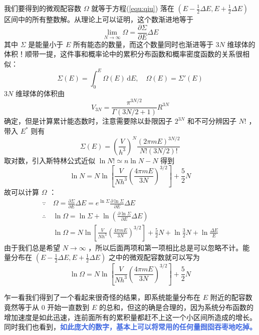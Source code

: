 我们要得到的微观配容数 $\Omega$ 就等于方程(\ref*{equ:qiu}) 落在 $(E-\frac{1}{2} \Delta E ,E+\frac{1}{2} \Delta E)$ 区间中的所有整数解。从理论上可以证明，这个数渐进地等于
\begin{equation}\label{equ:lim}
    \lim_{N\rightarrow \infty}\Omega = \frac{\partial \Sigma}{\partial E}\Delta E
\end{equation}
其中 $\Sigma$ 是能量小于 $E$ 所有能态的数量，而这个数量同时也渐进等于 $3N$ 维球体的体积！顺带一提，这件事和概率论中的累积分布函数和概率密度函数的关系很相似：
\[
    \Sigma(E) = \int_{0}^{E}\Omega(E)\,\mathrm dE,\quad \Omega(E) = \Sigma'(E)
\]
 $3N$ 维球体的体积由
\begin{equation}
    V_{3 N}=\frac{\pi^{3 N / 2}}{\Gamma(3 N / 2+1)} R^{3 N}
\end{equation}
确定，但是计算累计能态数时，注意需要除以卦限因子 $2^{3N}$ 和不可分辨因子 $N!$ ，带入 $E^*$ 则有
\begin{equation}
    \Sigma(E)= \left(\frac{V}{h^3} \right)^N \frac{(2\pi mE)^{3N/2}}{N!(3N/2)!} 
\end{equation}
取对数，引入斯特林公式近似 $\ln N! \simeq n\ln N - N$ 得到
\begin{equation}\label{equ:lnN}
    \ln N = N \ln\left[ \frac{V}{N h^3} \left(\frac{4\pi mE}{3N} \right)^{3/2}  \right] + \frac{5}{2} N
\end{equation}
故可以计算 $\Omega$ ：
\begin{align*}
    \because ~& \Omega = \frac{\partial \Sigma}{\partial E}\Delta E = e^{\ln \Sigma} \frac{\partial \ln\Sigma}{\partial E}\Delta E \\
    \therefore~& \ln \Omega = \ln \Sigma + \ln\left(\frac{\partial \ln\Sigma}{\partial E}\Delta E\right) \\
    ~& \ln \Omega = N \ln\left[ \frac{V}{N h^3} \left(\frac{4\pi mE}{3N} \right)^{3/2}  \right] + \frac{5}{2} N + \ln \frac{3}{2} N +\ln \frac{\Delta E}{E} 
\end{align*}
由于我们总是希望 $N\rightarrow \infty$ ，所以后面两项和第一项相比总是可以忽略不计。能量分布在 $(E-\frac{1}{2} \Delta E ,E+\frac{1}{2} \Delta E)$ 之中的微观配容数就可以写为
\begin{equation}
    \ln \Omega = N \ln\left[ \frac{V}{N h^3} \left(\frac{4\pi mE}{3N} \right)^{3/2}  \right] + \frac{5}{2} N 
\end{equation}

乍一看我们得到了一个看起来很奇怪的结果，即系统能量分布在 $E$ 附近的配容数竟然等于从 $0$ 开始一直数到 $E$ 的总和，但这的确是合理的，因为系统分布函数的增加速度是如此迅速，连前面所有的累积量都赶不上这一个小区间所造成的增长。同时我们也看到，\textcolor{RoyalBlue}{\textbf{\kaishu 如此庞大的数字，基本上可以将常用的任何量囫囵吞枣地吃掉。}} 

